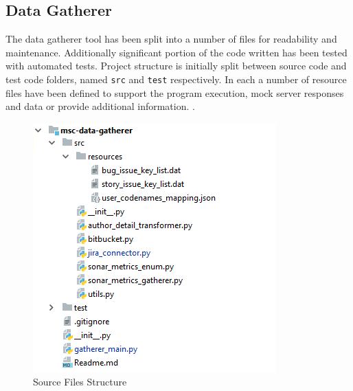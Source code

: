 \subsection{Data Gatherer}\label{sec:impl-data-gatherer}
The data gatherer tool has been split into a number of files for readability and maintenance. Additionally significant portion of the code written has been tested with automated tests. Project structure is initially split between source code and test code folders, named \texttt{src} and \texttt{test} respectively. In each a number of resource files have been defined to support the program execution, mock server responses and data or provide additional information. .


\begin{figure}[!h]
    \centering
    \includegraphics{Figures/impl_src_folder_files.png}
    \caption{Source Files Structure}
    \label{fig:impl-data-gatherer-source-files}
\end{figure}

